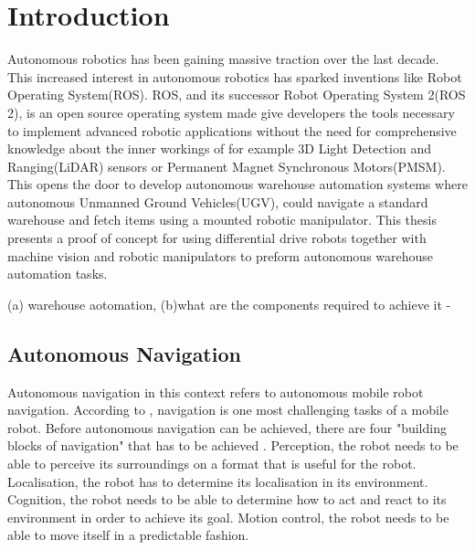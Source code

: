 \chapter{Introduction}

Autonomous robotics has been gaining massive traction over the last decade. This increased interest in autonomous robotics has sparked inventions like Robot Operating System(ROS). ROS, and its successor Robot Operating System 2(ROS 2), is an open source operating system made give developers the tools necessary to implement advanced robotic applications without the need for comprehensive knowledge about the inner workings of for example 3D Light Detection and Ranging(LiDAR) sensors or Permanent Magnet Synchronous Motors(PMSM).  This opens the door to develop autonomous warehouse automation systems where autonomous Unmanned Ground Vehicles(UGV), could navigate a standard warehouse and fetch items using a mounted robotic manipulator. This thesis presents a proof of concept for using differential drive robots together with machine vision and robotic manipulators to preform autonomous warehouse automation tasks.



(a) warehouse aotomation, (b)what are the components required to achieve it - 


\section{Autonomous Navigation}\label{sec:I:AutonomousNavigation}
Autonomous navigation in this context refers to autonomous mobile robot navigation. According to \cite{SiegwartRoland2011Itam}, navigation is one most challenging tasks of a mobile robot. Before autonomous navigation can be achieved, there are four "building blocks of navigation" that has to be achieved \cite{SiegwartRoland2011Itam}. Perception, the robot needs to be able to perceive its surroundings on a format that is useful for the robot. Localisation, the robot has to determine its localisation in its environment. Cognition, the robot needs to be able to determine how to act and react to its environment in order to achieve its goal. Motion control, the robot needs to be able to move itself in a predictable fashion.